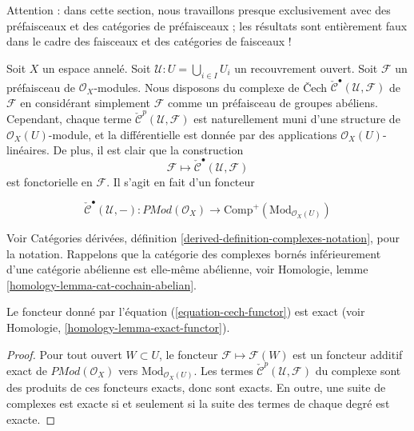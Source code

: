 \noindent
Attention : dans cette section, nous travaillons presque exclusivement avec des préfaisceaux et des catégories de préfaisceaux ; les résultats sont entièrement faux dans le cadre des faisceaux et des catégories de faisceaux !

\medskip\noindent

Soit $X$ un espace annelé. Soit $\mathcal{U} : U = \bigcup_{i \in I} U_i$ un recouvrement ouvert. Soit $\mathcal{F}$ un préfaisceau de $\mathcal{O}_X$-modules. Nous disposons du complexe de {\v C}ech
$\check{\mathcal{C}}^\bullet(\mathcal{U}, \mathcal{F})$
de $\mathcal{F}$ en considérant simplement $\mathcal{F}$
comme un préfaisceau de groupes abéliens. Cependant, chaque terme
$\check{\mathcal{C}}^p(\mathcal{U}, \mathcal{F})$ est naturellement muni d'une structure de $\mathcal{O}_X(U)$-module, et la différentielle est donnée par des
applications $\mathcal{O}_X(U)$-linéaires. De plus, il est clair que la construction
$$
\mathcal{F} \longmapsto \check{\mathcal{C}}^\bullet(\mathcal{U}, \mathcal{F})
$$
est fonctorielle en $\mathcal{F}$. Il s'agit en fait d'un foncteur

\begin{equation}
\label{equation-cech-functor}
\check{\mathcal{C}}^\bullet(\mathcal{U}, -) :
\textit{PMod}(\mathcal{O}_X)
\longrightarrow
\text{Comp}^{+}(\text{Mod}_{\mathcal{O}_X(U)})
\end{equation}

Voir Catégories dérivées, définition \ref{derived-definition-complexes-notation},
pour la notation. Rappelons que la catégorie des complexes bornés inférieurement d'une catégorie abélienne est elle-même abélienne, voir Homologie, lemme \ref{homology-lemma-cat-cochain-abelian}.

\begin{lemma}

\label{lemma-cech-exact-presheaves}

Le foncteur donné par l'équation (\ref{equation-cech-functor}) est exact (voir Homologie, \ref{homology-lemma-exact-functor}).

\end{lemma}

\begin{proof}

Pour tout ouvert $W \subset U$, le foncteur
$\mathcal{F} \mapsto \mathcal{F}(W)$ est un foncteur additif exact de $\textit{PMod}(\mathcal{O}_X)$ vers $\text{Mod}_{\mathcal{O}_X(U)}$. Les termes
$\check{\mathcal{C}}^p(\mathcal{U}, \mathcal{F})$
du complexe sont des produits de ces foncteurs exacts, donc sont exacts. En outre, une suite de complexes est exacte si et seulement si la suite des termes de chaque degré est exacte.

\end{proof}

